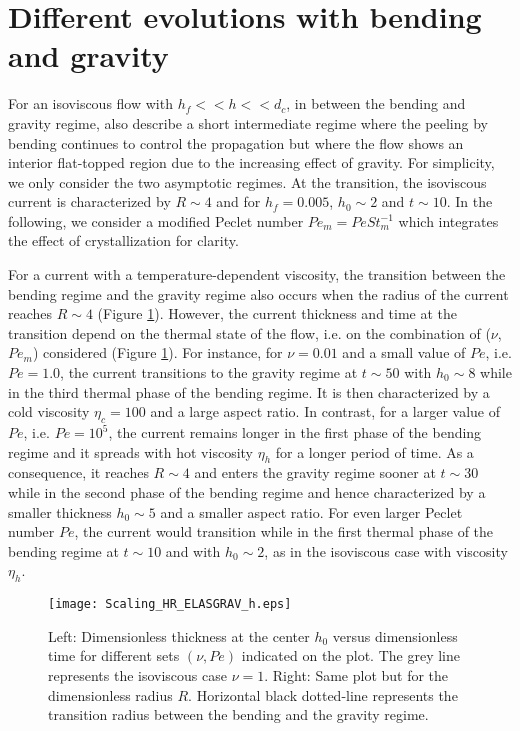 \section{Different evolutions with bending and gravity}
\label{C3-sec:diff-evol-with-1}

For an  isoviscous flow with $h_f<<  h<< d_c$, in between  the bending
and  gravity  regime,  \citet{Lister:2013ia}  also  describe  a  short
intermediate regime where the peeling  by bending continues to control
the  propagation but  where  the flow  shows  an interior  flat-topped
region due  to the  increasing effect of  gravity. For  simplicity, we
only  consider the  two asymptotic  regimes.  At  the transition,  the
isoviscous current  is characterized by $R\sim4$  and for $h_f=0.005$,
$h_0 \sim 2$ and $t \sim 10$. In the following, we consider a modified
Peclet number  $Pe_m =  Pe St_m^{-1}$ which  integrates the  effect of
crystallization for clarity.

For a  current with a temperature-dependent  viscosity, the transition
between the bending regime and the gravity regime also occurs when the
radius    of     the    current    reaches    $R\sim     4$    (Figure
\ref{C3-Scaling_HR_ELASGRAV_h}).  However,  the current  thickness and
time at the  transition depend on the thermal state  of the flow, i.e.
on    the   combination    of   ($\nu$,$Pe_m$)    considered   (Figure
\ref{C3-Scaling_HR_ELASGRAV_h}).  For  instance, for $\nu=0.01$  and a
small value of $Pe$, i.e.  $Pe  = 1.0$, the current transitions to the
gravity regime  at $t \sim  50$ with $h_0 \sim  8$ while in  the third
thermal phase  of the bending  regime. It  is then characterized  by a
cold viscosity  $\eta_c=100$ and a  large aspect ratio.   In contrast,
for a  larger value  of $Pe$,  i.e.  $Pe=  10^5$, the  current remains
longer in  the first phase of  the bending regime and  it spreads with
hot viscosity $\eta_h$ for a longer period of time.  As a consequence,
it  reaches  $R \sim  4$  and  enters  the  gravity regime  sooner  at
$t\sim 30$ while  in the second phase of the  bending regime and hence
characterized by a smaller thickness  $h_0\sim 5$ and a smaller aspect
ratio.   For  even  larger  Peclet  number  $Pe$,  the  current  would
transition while in  the first thermal phase of the  bending regime at
$t \sim  10$ and  with $h_0 \sim  2$, as in  the isoviscous  case with
viscosity $\eta_h$.

\begin{figure}
  \begin{center}
    \graphicspath{ {/Users/thorey/Documents/These/Projet/Refroidissement/Skin_Model/Figure/JFM_V13/} }
    \texttt{[image: Scaling\_HR\_ELASGRAV\_h.eps]}
    \caption{Left: Dimensionless thickness at  the center $h_0$ versus
      dimensionless time  for different  sets $(\nu,Pe)$  indicated on
      the plot.  The grey line represents the isoviscous case $\nu=1$.
      Right:  Same   plot  but  for  the   dimensionless  radius  $R$.
      Horizontal  black dotted-line  represents the  transition radius
      between the bending and the gravity regime.}
    \label{C3-Scaling_HR_ELASGRAV_h}
  \end{center}
\end{figure}

